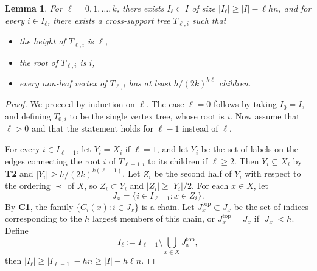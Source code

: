 \documentclass[11pt]{article}
\newtheorem{lemma}[lemma]{Lemma}
\theoremstyle{definition}
\begin{document}
 \begin{lemma}
 For $\ell=0,1,\dots,k$, there exists $I_{\ell}\subset I$ of size $|I_{\ell}|\geq |I|-\ell h n$, and for every $i\in I_{\ell}$, there exists a cross-support tree $T_{\ell,i}$ such that 
\begin{itemize}
    \item[(1)] the height of $T_{\ell,i}$ is $\ell$,
    \item[(2)] the root of $T_{\ell,i}$ is $i$,
    \item[(3)] every non-leaf vertex of $T_{\ell,i}$ has at least $h/(2k)^{k\ell}$ children.
\end{itemize}
\end{lemma}
\begin{proof}
We proceed by induction on $\ell$. The case $\ell=0$ follows by taking $I_0=I$, and defining $T_{0,i}$ to be the single vertex tree, whose root is $i$. Now assume that $\ell>0$ and that the statement holds for $\ell-1$ instead of $\ell$.

For every $i\in I_{\ell-1}$, let $Y_i=X_i$ if $\ell=1$, and let $Y_i$ be the set of labels on the edges connecting the root $i$ of $T_{\ell-1,i}$ to its children if $\ell\geq 2$. Then $Y_i\subseteq X_i$ by \textbf{T2} and $|Y_i|\geq h/(2k)^{k(\ell-1)}$. Let $Z_i$ be the second half of $Y_i$ with respect to the ordering $\prec$ of $X$, so $Z_i\subset Y_i$ and $|Z_i|\geq |Y_i|/2$. For each $x\in X$, let 
$$J_x=\{i\in I_{\ell-1}:x\in Z_i\}.$$
By \textbf{C1}, the family $\{C_i(x):i\in J_x\}$ is a chain. Let $J^{\text{top}}_x\subset J_x$ be the set of indices corresponding to the $h$ largest members of this chain, or $J^{\text{top}}_x=J_x$ if $|J_x|<h$. Define 
$$I_{\ell}:=I_{\ell-1}\setminus \bigcup_{x\in X}J_x^{\text{top}},$$
then $|I_{\ell}|\geq |I_{\ell-1}|-hn\geq |I|-h\ell n$.


\end{proof}
\end{document}
